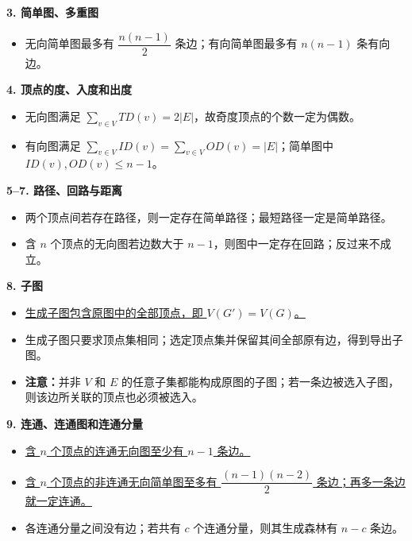 \documentclass[UTF8,10pt,fontset=mac]{ctexart}
\begin{document}
\noindent\textbf{3. 简单图、多重图}
\begin{itemize}[leftmargin=1.8em,itemsep=1.2pt,topsep=1pt]
  \item 无向简单图最多有 $\dfrac{n(n-1)}{2}$ 条边；有向简单图最多有 $n(n-1)$ 条有向边。
\end{itemize}

\noindent\textbf{4. 顶点的度、入度和出度}
\begin{itemize}[leftmargin=1.8em,itemsep=1.2pt,topsep=1pt]
  \item 无向图满足 $\displaystyle\sum_{v\in V}TD(v)=2|E|$，故奇度顶点的个数一定为偶数。
  \item 有向图满足 $\displaystyle\sum_{v\in V}ID(v)=\sum_{v\in V}OD(v)=|E|$；简单图中 $ID(v),OD(v)\le n-1$。
\end{itemize}

\noindent\textbf{5--7. 路径、回路与距离}
\begin{itemize}[leftmargin=1.8em,itemsep=1.2pt,topsep=1pt]
  \item 两个顶点间若存在路径，则一定存在简单路径；最短路径一定是简单路径。
  \item 含 $n$ 个顶点的无向图若边数大于 $n-1$，则图中一定存在回路；反过来不成立。
\end{itemize}

\noindent\textbf{8. 子图}
\begin{itemize}[leftmargin=1.8em,itemsep=1.2pt,topsep=1pt]
  \item \uline{生成子图包含原图中的全部顶点，即 $V(G')=V(G)$。}
  \item 生成子图只要求顶点集相同；选定顶点集并保留其间全部原有边，得到导出子图。
  \item \textbf{注意：}并非 $V$ 和 $E$ 的任意子集都能构成原图的子图；若一条边被选入子图，则该边所关联的顶点也必须被选入。
\end{itemize}

\noindent\textbf{9. 连通、连通图和连通分量}
\begin{itemize}[leftmargin=1.8em,itemsep=1.2pt,topsep=1pt]
  \item \uline{含 $n$ 个顶点的连通无向图至少有 $n-1$ 条边。}
  \item \uline{含 $n$ 个顶点的非连通无向简单图至多有 $\dfrac{(n-1)(n-2)}{2}$ 条边；再多一条边就一定连通。}
  \item 各连通分量之间没有边；若共有 $c$ 个连通分量，则其生成森林有 $n-c$ 条边。
\end{itemize}
\end{document}
